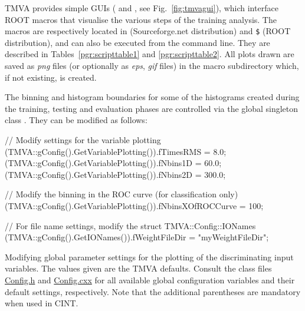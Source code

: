 TMVA provides simple GUIs ( and
, see
Fig.~\ref{fig:tmvagui}), which interface ROOT macros that visualise
the various steps of the training analysis. The macros are
respectively located in  (Sourceforge.net
distribution) and {\tt \$} (ROOT
distribution), and can also be executed from the command line. They
are described in Tables~\ref{pgr:scripttable1} and
\ref{pgr:scripttable2}. All plots drawn are saved as {\em png} files
(or optionally as {\em eps}, {\em gif} files) in the macro
subdirectory  which, if not existing, is created.

The binning and histogram boundaries for some of the histograms
created during the training, testing and evaluation phases are
controlled via the global singleton class . They
can be modified as follows:
\begin{codeexample}
\begin{tmvacode}
// Modify settings for the variable plotting
(TMVA::gConfig().GetVariablePlotting()).fTimesRMS = 8.0;
(TMVA::gConfig().GetVariablePlotting()).fNbins1D  = 60.0;
(TMVA::gConfig().GetVariablePlotting()).fNbins2D  = 300.0;

// Modify the binning in the ROC curve (for classification only)
(TMVA::gConfig().GetVariablePlotting()).fNbinsXOfROCCurve = 100;

// For file name settings, modify the struct TMVA::Config::IONames
(TMVA::gConfig().GetIONames()).fWeightFileDir = "myWeightFileDir";
\end{tmvacode}
\caption[.]{\codeexampleCaptionSize Modifying global parameter
  settings for the plotting of the discriminating input variables. The
  values given are the TMVA defaults. Consult the class files
  \href{http://tmva.svn.sourceforge.net/viewvc/tmva/trunk/TMVA/src/Config.h?view=markup}{Config.h}
  and
  \href{http://tmva.svn.sourceforge.net/viewvc/tmva/trunk/TMVA/src/Config.cxx?view=markup}{Config.cxx}
  for all available global configuration variables and their default
  settings, respectively.  Note that the additional parentheses are
  mandatory when used in CINT.}
\label{ce:gconfig}
\end{codeexample}
